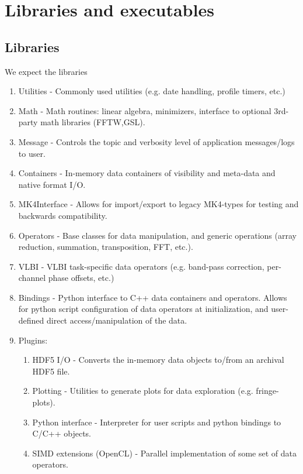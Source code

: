 \documentclass[hidelinks]{article}
\let\Oldsection\section
\renewcommand{\section}{\FloatBarrier\Oldsection}
\let\Oldsubsection\subsection
\renewcommand{\subsection}{\FloatBarrier\Oldsubsection}
\begin{document}
\section{Libraries and executables}

\subsection{Libraries}

We expect the libraries

\begin{enumerate}
     \item Utilities - Commonly used utilities (e.g. date handling, profile timers, etc.)
     \item Math - Math routines: linear algebra, minimizers, interface to optional 3rd-party math libraries (FFTW,GSL).
     \item Message - Controls the topic and verbosity level of application messages/logs to user.
     \item Containers - In-memory data containers of visibility and meta-data and native format I/O.
     \item MK4Interface - Allows for import/export to legacy MK4-types for testing and backwards compatibility.
     \item Operators - Base classes for data manipulation, and generic operations (array reduction, summation, transposition, FFT, etc.).
     \item VLBI - VLBI task-specific data operators (e.g. band-pass correction, per-channel phase offsets, etc.)
     \item Bindings - Python interface to C++ data containers and operators. Allows for python script configuration of data 
     operators at initialization, and user-defined direct access/manipulation of the data.
 
 \item Plugins:
 \begin{enumerate}
    \item HDF5 I/O - Converts the in-memory data objects to/from an archival HDF5 file.
    \item Plotting - Utilities to generate plots for data exploration (e.g. fringe-plots).
    \item Python interface - Interpreter for user scripts and python bindings to C/C++ objects.
    \item SIMD extensions (OpenCL) - Parallel implementation of some set of data operators.
 \end{enumerate}
 

\end{enumerate}
\end{document}
